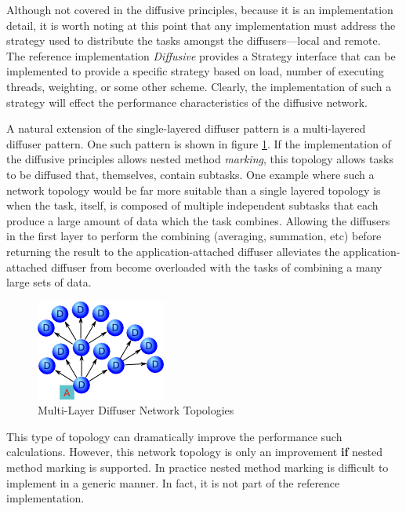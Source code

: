 \documentclass[11pt]{article}
\begin{document}
Although not covered in the diffusive principles, because it is an implementation detail, it is worth noting at this point that any implementation must address the strategy used to distribute the tasks amongst the diffusers---local and remote. The reference implementation \emph{Diffusive} provides a \textsf{Strategy} interface that can be implemented to provide a specific strategy based on load, number of executing threads, weighting, or some other scheme. Clearly, the implementation of such a strategy will effect the performance characteristics of the diffusive network.

A natural extension of the single-layered diffuser pattern is a multi-layered diffuser pattern. One such pattern is  shown in figure \ref{fig:topology_multi_layer}. If the implementation of the diffusive principles allows nested method \emph{marking}, this topology allows tasks to be diffused that, themselves, contain subtasks. One example where such a network topology would be far more suitable than a single layered topology is when the task, itself, is composed of multiple independent subtasks that each produce a large amount of data which the task combines. Allowing the diffusers in the first layer to perform the combining (averaging, summation, etc) before returning the result to the application-attached diffuser alleviates the application-attached diffuser from become overloaded with the tasks of combining a many large sets of data. 

\begin{figure}[htbp]
\begin{center}
\includegraphics[scale=1.0]{topology_multi_layer}
\caption{Multi-Layer Diffuser Network Topologies\label{fig:topology_multi_layer}}
\end{center}
\end{figure}

This type of topology can dramatically improve the performance such calculations. However, this network topology is only an improvement \textbf{if} nested method marking is supported. In practice nested method marking is difficult to implement in a generic manner. In fact, it is not part of the reference implementation.
\end{document}
